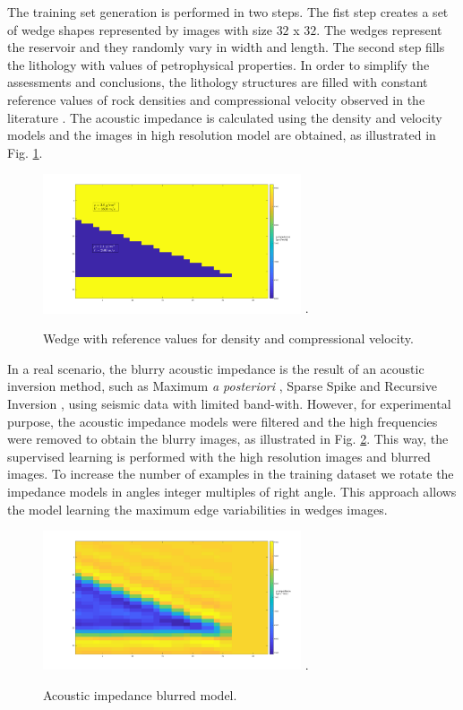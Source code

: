 \documentclass[conference,compsoc]{IEEEtran}
\begin{document}
The training set generation is performed in two steps.
The fist step creates a set of wedge shapes represented
by images with size $32$ x $32$. The wedges represent the reservoir and they
randomly vary in width and length. The second step fills the lithology with values of petrophysical properties.
In order to simplify the assessments and conclusions, the lithology structures are filled with constant
reference values of rock densities and compressional velocity observed in the literature \cite{Mavko2009}.
The acoustic impedance is calculated using the density and velocity models and the images in high
resolution model are obtained, as illustrated in  Fig. \ref{fig_lithology}.
\begin{figure}[!t]
\centering
\includegraphics[width=3.0in]{Figs/Image_Paper}
\DeclareGraphicsExtensions.
\caption{Wedge with reference values for density and compressional velocity.}
\label{fig_lithology}
\end{figure}
In a real scenario, the blurry acoustic impedance is the
result of an acoustic inversion method, such as Maximum \textit{a posteriori} \cite{Buland2003,Figueiredo2012}, Sparse Spike \cite{Debeye1990} 
and Recursive Inversion \cite{Chopra2001}, using seismic data with limited band-with.
However, for experimental purpose, the acoustic impedance models were filtered
and the high frequencies were removed to obtain the blurry images, as illustrated in Fig. \ref{fig_blur}.
This way, the supervised learning is performed with the high resolution images and blurred images.
To increase the number of examples in the training dataset we rotate
the impedance models in angles integer multiples of right angle. This approach allows the model learning the maximum edge variabilities
in wedges images.
\begin{figure}[!t]
\centering
\includegraphics[width=3.0in]{Figs/Image_Paper_blurred}
\DeclareGraphicsExtensions.
\caption{Acoustic impedance blurred model.}
\label{fig_blur}
\end{figure}
\end{document}
